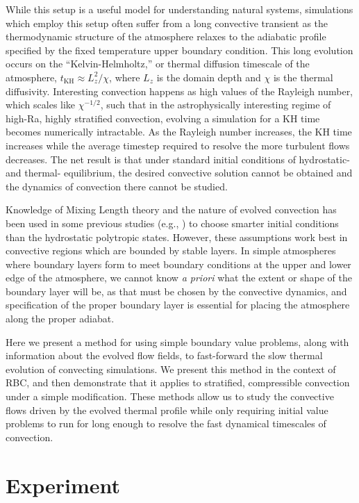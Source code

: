 \documentclass[aps, pre, onecolumn, nofootinbib, notitlepage, groupedaddress, amsfonts, amssymb, amsmath, longbibliography]{revtex4-1}
\begin{document}
While this setup is a useful model for understanding natural
systems, simulations which employ this setup often suffer from a long convective transient as the thermodynamic structure
of the atmosphere relaxes to the adiabatic profile specified by the fixed temperature upper boundary condition.
This long evolution occurs on the ``Kelvin-Helmholtz,'' or thermal diffusion timescale of the atmosphere, 
$t_{\text{KH}} \approx L_z^2 / \chi$, where $L_z$ is the domain depth and $\chi$ is the thermal diffusivity.
Interesting convection happens as high values of the Rayleigh number, which scales like $\chi^{-1/2}$, such that
in the astrophysically interesting regime of high-Ra, highly stratified convection, evolving a simulation for a
KH time becomes numerically intractable.  As the Rayleigh number increases, the KH time increases while the average
timestep required to resolve the more turbulent flows decreases.  The net result is that under standard initial conditions
of hydrostatic- and thermal- equilibrium, the desired convective solution cannot be obtained and the dynamics of convection
there cannot be studied.

Knowledge of Mixing Length theory and the nature of evolved convection has been used in some 
previous studies (e.g., \cite{brandenburg&all2005}) to choose smarter initial conditions than
the hydrostatic polytropic states.  However, these assumptions work best in convective regions
which are bounded by stable layers.  In simple atmospheres where boundary layers form to meet
boundary conditions at the upper and lower edge of the atmosphere, we cannot know 
\emph{a priori} what the extent or shape of the boundary layer will be, as that must be chosen
by the convective dynamics, and specification of the proper boundary layer is essential for
placing the atmosphere along the proper adiabat.

Here we present a method for using simple boundary value problems, along with information about the evolved flow fields,
to fast-forward the slow thermal evolution of convecting simulations.  We present this method in the context of RBC, and
then demonstrate that it applies to stratified, compressible convection under a simple modification.  These methods allow
us to study the convective flows driven by the evolved thermal profile while only requiring initial value problems to run
for long enough to resolve the fast dynamical timescales of convection.


\section{Experiment} 
\label{sec:experiment}
\end{document}
